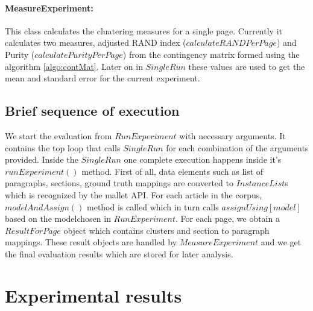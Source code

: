 \paragraph{MeasureExperiment: }
This class calculates the cluatering measures for a single page. Currently it calculates two measures, adjusted RAND index ($calculateRANDPerPage$) and Purity ($calculatePurityPerPage$) from the contingency matrix formed using the algorithm \ref{algo:contMat}. Later on in $SingleRun$ these values are used to get the mean and standard error for the current experiment.

\subsection{Brief sequence of execution}
We start the evaluation from $RunExperiment$ with necessary arguments. It contains the top loop that calls $SingleRun$ for each combination of the arguments provided. Inside the $SingleRun$ one complete execution happens inside it's $runExperiment()$ method. First of all, data elements such as list of paragraphs, sections, ground truth mappings are converted to $InstanceList$s which is recognized by the mallet API. For each article in the corpus, $modelAndAssign()$ method is called which in turn calls $assignUsing[model]$ based on the modelchosen in $RunExperiment$. For each page, we obtain a $ResultForPage$ object which contains clusters and section to paragraph mappings. These result objects are handled by $MeasureExperiment$ and we get the final evaluation results which are stored for later analysis. 

\section{Experimental results}
\label{sec:results}
